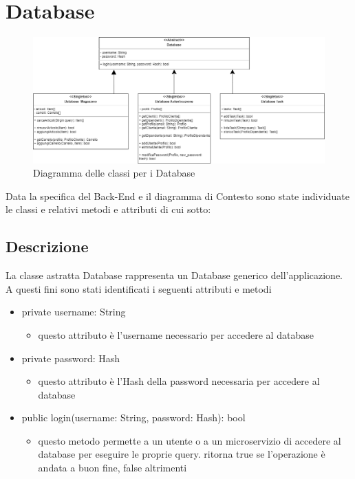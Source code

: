 \documentclass{report}
\begin{document}
\section{Database}
\begin{figure}[H]
	\centering\includegraphics[width=1\textwidth]{images/Diagramma_delle_classi_Database.png}
	Diagramma delle classi per i Database
\end{figure}
Data la specifica del Back-End e il diagramma di Contesto sono state individuate le classi e relativi metodi e attributi di cui sotto:
\subsection*{Descrizione}
La classe astratta Database rappresenta un Database generico dell'applicazione.
A questi fini sono stati identificati i seguenti attributi e metodi
\begin{itemize}
	\item private username: String 
	\begin{itemize}
		\item questo attributo è l'username necessario per accedere al database
	\end{itemize}
	\item private password: Hash 
	\begin{itemize}
		\item questo attributo è l'Hash della password necessaria per accedere al database
	\end{itemize}
	\item public login(username: String, password: Hash): bool 
	\begin{itemize}
		\item questo metodo permette a un utente o a un microservizio di accedere al database per eseguire le proprie query. ritorna true se l'operazione è andata a buon fine, false altrimenti
	\end{itemize}
\end{itemize}
\end{document}
